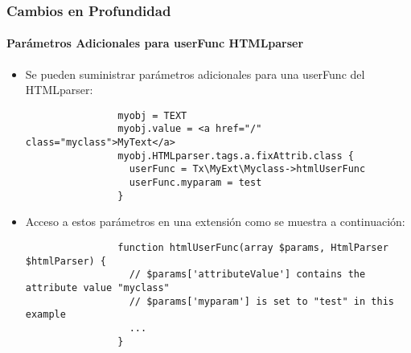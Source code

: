 \begin{frame}[fragile]
	\frametitle{Cambios en Profundidad}
	\framesubtitle{Parámetros Adicionales para userFunc HTMLparser}

	\lstset{basicstyle=\tiny\ttfamily}

	\begin{itemize}

		\item Se pueden suministrar parámetros adicionales para una userFunc del HTMLparser:

			\begin{lstlisting}
				myobj = TEXT
				myobj.value = <a href="/" class="myclass">MyText</a>
				myobj.HTMLparser.tags.a.fixAttrib.class {
				  userFunc = Tx\MyExt\Myclass->htmlUserFunc
				  userFunc.myparam = test
				}
			\end{lstlisting}

		\item Acceso a estos parámetros en una extensión como se muestra a continuación:

			\begin{lstlisting}
				function htmlUserFunc(array $params, HtmlParser $htmlParser) {
				  // $params['attributeValue'] contains the attribute value "myclass"
				  // $params['myparam'] is set to "test" in this example
				  ...
				}
			\end{lstlisting}

	\end{itemize}

\end{frame}

